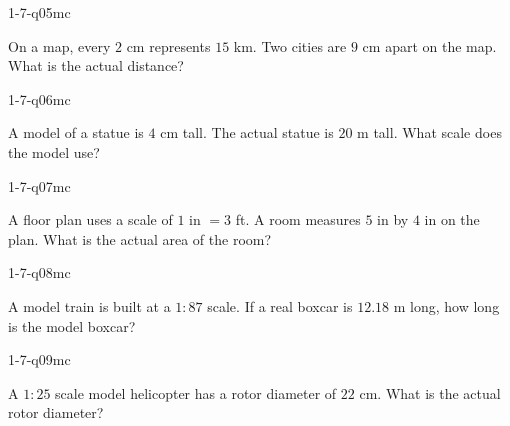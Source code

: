 \begin{practiceQuestion}{1-7-q05}{mc}
\begin{questionText}
On a map, every $2$ cm represents $15$ km. Two cities are $9$ cm apart on the map. What is the actual distance?
\end{questionText}
\end{practiceQuestion}

\begin{practiceQuestion}{1-7-q06}{mc}
\begin{questionText}
A model of a statue is $4$ cm tall. The actual statue is $20$ m tall. What scale does the model use?
\end{questionText}
\end{practiceQuestion}

\begin{practiceQuestion}{1-7-q07}{mc}
\begin{questionText}
A floor plan uses a scale of $1$ in $= 3$ ft. A room measures $5$ in by $4$ in on the plan. What is the actual area of the room?
\end{questionText}
\end{practiceQuestion}

\begin{practiceQuestion}{1-7-q08}{mc}
\begin{questionText}
A model train is built at a $1 : 87$ scale. If a real boxcar is $12.18$ m long, how long is the model boxcar?
\end{questionText}
\end{practiceQuestion}

\begin{practiceQuestion}{1-7-q09}{mc}
\begin{questionText}
A $1 : 25$ scale model helicopter has a rotor diameter of $22$ cm. What is the actual rotor diameter?
\end{questionText}
\end{practiceQuestion}

